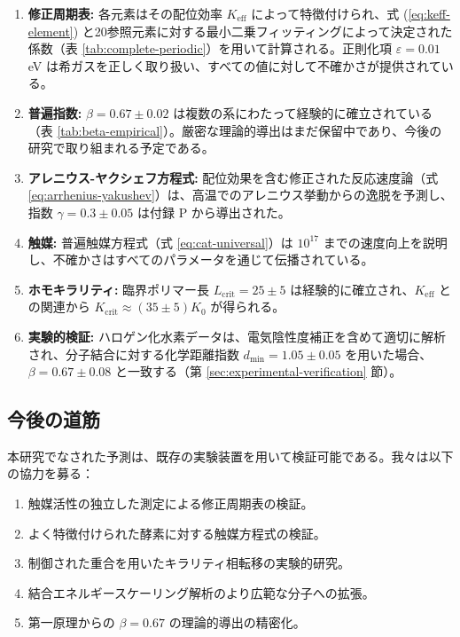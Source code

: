 \documentclass[11pt,a4paper]{article}
\newcommand{\Keff}{K_{\mathrm{eff}}}
\newcommand{\Kcrit}{K_{\mathrm{crit}}}
\begin{document}
	\begin{enumerate}
		\item \textbf{修正周期表:} 各元素はその配位効率 $\Keff$ によって特徴付けられ、式 (\ref{eq:keff-element}) と20参照元素に対する最小二乗フィッティングによって決定された係数（表 \ref{tab:complete-periodic}）を用いて計算される。正則化項 $\varepsilon = 0.01$ eV は希ガスを正しく取り扱い、すべての値に対して不確かさが提供されている。
		\item \textbf{普遍指数:} $\beta = 0.67 \pm 0.02$ は複数の系にわたって経験的に確立されている（表 \ref{tab:beta-empirical}）。厳密な理論的導出はまだ保留中であり、今後の研究で取り組まれる予定である。
		\item \textbf{アレニウス-ヤクシェフ方程式:} 配位効果を含む修正された反応速度論（式 \ref{eq:arrhenius-yakushev}）は、高温でのアレニウス挙動からの逸脱を予測し、指数 $\gamma = 0.3 \pm 0.05$ は付録 P から導出された。
		\item \textbf{触媒:} 普遍触媒方程式（式 \ref{eq:cat-universal}）は $10^{17}$ までの速度向上を説明し、不確かさはすべてのパラメータを通じて伝播されている。
		\item \textbf{ホモキラリティ:} 臨界ポリマー長 $L_{\text{crit}} = 25 \pm 5$ は経験的に確立され、$\Keff$ との関連から $\Kcrit \approx (35 \pm 5) K_0$ が得られる。
		\item \textbf{実験的検証:} ハロゲン化水素データは、電気陰性度補正を含めて適切に解析され、分子結合に対する化学距離指数 $d_{\text{min}} = 1.05 \pm 0.05$ を用いた場合、$\beta = 0.67 \pm 0.08$ と一致する（第 \ref{sec:experimental-verification} 節）。
	\end{enumerate}
	
	\subsection{今後の道筋}
	
	本研究でなされた予測は、既存の実験装置を用いて検証可能である。我々は以下の協力を募る：
	\begin{enumerate}
		\item 触媒活性の独立した測定による修正周期表の検証。
		\item よく特徴付けられた酵素に対する触媒方程式の検証。
		\item 制御された重合を用いたキラリティ相転移の実験的研究。
		\item 結合エネルギースケーリング解析のより広範な分子への拡張。
		\item 第一原理からの $\beta = 0.67$ の理論的導出の精密化。
	\end{enumerate}
	
\end{document}
